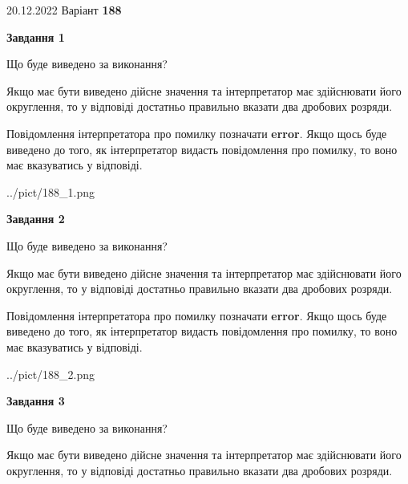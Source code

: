 \documentclass[12pt, ukrainian]{article}
\begin{document}
{20.12.2022 Варіант \No \textbf { 188 }\par}
{
\begin {Large}

{\begin {center}\textbf{Завдання 1}\end {center}}\par
Що буде виведено за виконання? \par

Якщо має бути виведено дійсне значення та інтерпретатор має здійснювати його округлення, 
то у відповіді достатньо правильно вказати два дробових розряди.

Повідомлення інтерпретатора про помилку позначати \textbf{error}.
Якщо щось буде виведено до того, як інтерпретатор видасть повідомлення про помилку, 
то воно має вказуватись у відповіді. \par

\begin{center}
	{../pict/188_1.png}
\end{center}
\newpage

{\begin {center}\textbf{Завдання 2}\end {center}}\par
Що буде виведено за виконання? \par

Якщо має бути виведено дійсне значення та інтерпретатор має здійснювати його округлення, 
то у відповіді достатньо правильно вказати два дробових розряди.

Повідомлення інтерпретатора про помилку позначати \textbf{error}.
Якщо щось буде виведено до того, як інтерпретатор видасть повідомлення про помилку, 
то воно має вказуватись у відповіді. \par

\begin{center}
	{../pict/188_2.png}
\end{center}
\newpage

{\begin {center}\textbf{Завдання 3}\end {center}}\par
Що буде виведено за виконання? \par

Якщо має бути виведено дійсне значення та інтерпретатор має здійснювати його округлення, 
то у відповіді достатньо правильно вказати два дробових розряди.


\end{Large}}
\end{document}
